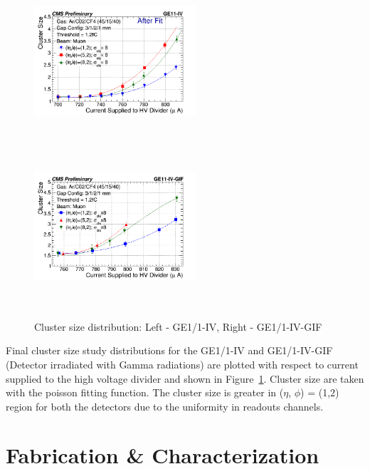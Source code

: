 \begin{figure}[!htbp]
   \begin{center}
     \includegraphics[width=6cm,height=6cm]{figures/GEM/CurrentvsClusterSizeAll3EtaPhi.png}
     \includegraphics[width=6cm,height=6cm]{figures/GEM/CurrentvsClusterSizeAll3EtaPhiGE11IVGIF.png}
   \end{center}
   \caption{Cluster size distribution: Left - GE1/1-IV, Right - GE1/1-IV-GIF}
   \label{fig:CSDGE1/1}
\end{figure}
Final cluster size study distributions for the GE1/1-IV and GE1/1-IV-GIF (Detector irradiated with Gamma radiations) are plotted with respect to current supplied to the high voltage divider and shown in Figure~\ref{fig:CSDGE1/1}. Cluster size are taken with the poisson fitting function. The cluster size is greater in ($\eta$, $\phi$) = (1,2) region for both the detectors due to the uniformity in readouts channels.



\section{Fabrication \& Characterization} %
\label{sec:fabrication_&_characterization}
